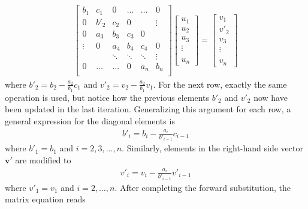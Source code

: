 \documentclass[aps,reprint]{revtex4-1}
\begin{document}
\begin{align*}
  \begin{bmatrix}
    b_1 & c_1 & 0  & \hdots & \hdots &   0    \\
    0 & b'_2 & c_2 & 0      & &\vdots \\
    0 & a_3 & b_3  & c_3     & 0 &  \\
    \vdots & 0 & a_4  & b_4     & c_4 & 0 \\
    & & \ddots & \ddots & \ddots & \vdots\\
    0 & \hdots  &\hdots & 0 &a_n & b_n \\
  \end{bmatrix}
  \begin{bmatrix}
    u_1 \\ u_2 \\ u_3 \\ \vdots \\ \\ u_n
  \end{bmatrix}
  =
  \begin{bmatrix}
    v_1 \\ v'_2 \\ v_3 \\ \vdots \\ \\ v_n
  \end{bmatrix}
\end{align*}
where $b'_2 = b_2 - \frac{a_2}{b_1} c_1$ and $v'_2 = v_2 - \frac{a_2}{b_1}v_1$.
For the next row, exactly the same operation is used, but notice how the previous
elements $b'_2$ and $v'_2$ now have been updated in the last iteration. Generalizing this
argument for each row, a general expression for the diagonal elements is
\begin{align*}
  b'_i = b_i - \frac{a_i}{b'_{i-1}}c_{i-1}
\end{align*}
where $b'_1 = b_1$ and $i = 2,3,...,n$. Similarly, elements in the right-hand side vector
$\mathbf{v}'$ are modified to
\begin{align*}
  v'_{i} = v_i - \frac{a_i}{b'_{i-1}}v'_{i-1}
\end{align*}
where $v'_1 = v_1$ and $i = 2,\hdots,n$. After completing the forward substitution,
the matrix equation reads
\end{document}
